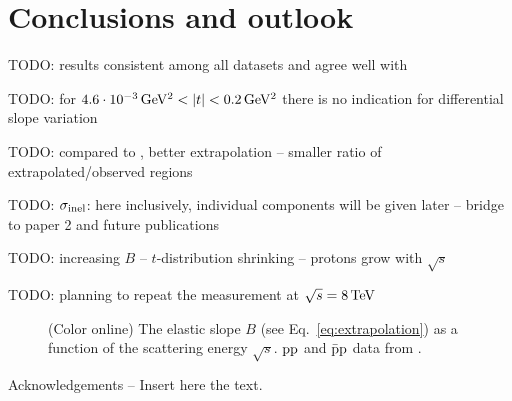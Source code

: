 \documentclass[doublecol]{../macros/epl2}
\def\un#1{\,{\rm #1}}
\begin{document}
\section{Conclusions and outlook}

TODO: results consistent among all datasets and agree well with \cite{epl96}

TODO: for $4.6\cdot10^{-3}\un{GeV^2} < |t| < 0.2\un{GeV^2}$ there is no indication for differential slope variation

TODO: compared to \cite{epl96}, better extrapolation -- smaller ratio of extrapolated/observed regions

TODO: $\sigma_{\rm inel}$: here inclusively, individual components will be given later -- bridge to paper 2 and future publications

TODO: increasing $B$ -- $t$-distribution shrinking -- protons grow with $\sqrt s$

TODO: planning to repeat the measurement at $\sqrt s = 8\un{TeV}$



\begin{figure}
\vskip-5mm
\caption{(Color online) The elastic slope $B$ (see Eq.~\ref{eq:extrapolation}) as a function of the scattering energy $\sqrt s$. $\rm pp$ and $\rm \bar pp$ data from \cite{pdg}.}
\label{fig:B s}
\end{figure}



\acknowledgments
Acknowledgements -- Insert here the text.
\end{document}
